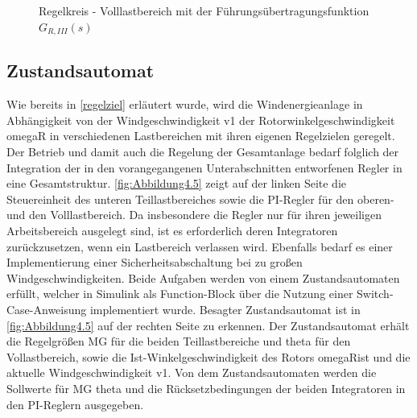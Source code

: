\begin{figure}[H]
    \centering
    \caption[Reglerkreis - Volllastbereich]{Regelkreis - Volllastbereich mit der Führungsübertragungsfunktion $G_{R,III}(s)$ \cite{SkriptSchulte}}
    \label{fig:Abbildung4.4}
\end{figure}

\subsection{Zustandsautomat} \label{statemachine}

Wie bereits in \autoref{regelziel} erläutert wurde, wird die Windenergieanlage in Abhängigkeit von der Windgeschwindigkeit \acs{v1} \bzw der Rotorwinkelgeschwindigkeit \acs{omegaR} in verschiedenen Lastbereichen mit ihren eigenen Regelzielen geregelt. Der Betrieb und damit auch die Regelung der Gesamtanlage bedarf folglich der Integration der in den vorangegangenen Unterabschnitten entworfenen Regler in eine Gesamtstruktur. \autoref{fig:Abbildung4.5} zeigt auf der linken Seite die Steuereinheit des unteren Teillastbereiches sowie die PI-Regler für den oberen- und den Volllastbereich. Da insbesondere die Regler nur für ihren jeweiligen Arbeitsbereich ausgelegt sind, ist es erforderlich deren Integratoren zurückzusetzen, wenn ein Lastbereich verlassen wird. Ebenfalls bedarf es einer Implementierung einer Sicherheitsabschaltung bei zu großen Windgeschwindigkeiten. Beide Aufgaben werden von einem Zustandsautomaten erfüllt, welcher in Simulink als Function-Block über die Nutzung einer Switch-Case-Anweisung implementiert wurde. Besagter Zustandsautomat ist in \autoref{fig:Abbildung4.5} auf der rechten Seite zu erkennen. Der Zustandsautomat erhält die Regelgrößen \acs{MG} für die beiden Teillastbereiche und \acs{theta} für den Vollastbereich, sowie die Ist-Winkelgeschwindigkeit des Rotors \acs{omegaRist} und die aktuelle Windgeschwindigkeit \acs{v1}. Von dem Zustandsautomaten werden die Sollwerte für \acs{MG} \bzw \acs{theta} und die Rücksetzbedingungen der beiden Integratoren in den PI-Reglern ausgegeben. 

